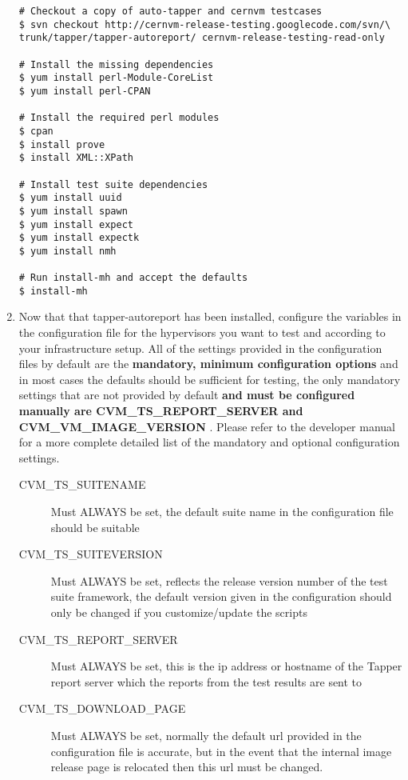 \begin{enumerate}
\begin{lstlisting}
# Checkout a copy of auto-tapper and cernvm testcases
$ svn checkout http://cernvm-release-testing.googlecode.com/svn/\
trunk/tapper/tapper-autoreport/ cernvm-release-testing-read-only

# Install the missing dependencies
$ yum install perl-Module-CoreList
$ yum install perl-CPAN

# Install the required perl modules
$ cpan
$ install prove
$ install XML::XPath

# Install test suite dependencies
$ yum install uuid
$ yum install spawn
$ yum install expect
$ yum install expectk
$ yum install nmh

# Run install-mh and accept the defaults
$ install-mh
\end{lstlisting}

\item	Now that that tapper-autoreport has been installed, configure the variables in the configuration file for the
		hypervisors you want to test and according to your \tapper infrastructure setup. All of the settings provided in
		the configuration files by default are the {\bf mandatory, minimum configuration options} and in most cases the
		defaults should be sufficient for testing, the only mandatory settings that are not provided by default {\bf and
		must be configured manually are CVM\_TS\_REPORT\_SERVER and CVM\_VM\_IMAGE\_VERSION }. Please refer to the developer manual
		for a more complete detailed list of the mandatory and optional configuration settings.

\begin{description}
\item[CVM\_TS\_SUITENAME]	Must ALWAYS be set, the default suite name in the configuration file should be suitable

	  		  
\item[CVM\_TS\_SUITEVERSION] 	Must ALWAYS be set, reflects the release version number of the test suite framework, the  default
								version given in the configuration should only be changed if you customize/update the scripts

\item[CVM\_TS\_REPORT\_SERVER]	Must ALWAYS be set, this is the ip address or hostname of the Tapper report server which the reports
      							from the test results are sent to
		
\item[CVM\_TS\_DOWNLOAD\_PAGE]	Must ALWAYS be set, normally the default url provided in the configuration file is accurate, but in the
								event that the internal \cernvm image release page is relocated then this url must be changed.


\end{description}
\end{enumerate}
